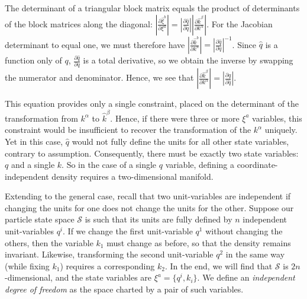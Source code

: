 \documentclass[letterpaper]{article}
\begin{document}
\noindent
The determinant of a triangular block matrix equals the product of determinants of the block matrices along the diagonal: $ \left|\frac{\partial \hat{\xi}^b}{\partial \xi^a} \right| =  \left|\frac{\partial \hat{q}}{\partial q}\right| \left|\frac{\partial \hat{k}^\beta}{\partial k^\alpha}\right|$. For the Jacobian determinant to equal one, we must therefore have  $\left|\frac{\partial \hat{k}^b}{\partial k^a} \right| =   \left|\frac{\partial \hat{q}}{\partial q}\right|^{-1}$. Since $\hat q$ is a function only of $q$, $\frac{\partial \hat{q}}{\partial q}$ is a total derivative, so we obtain the inverse by swapping the numerator and denominator. Hence, we see that $\left|\frac{\partial \hat{k}^\beta}{\partial k^\alpha} \right| = \left|\frac{\partial q}{\partial \hat q} \right|$. 

This equation provides only a single constraint, placed on the determinant of the transformation from $k^\alpha$ to $\hat{k}^\beta$. Hence, if there were three or more $\xi^a$ variables, this constraint would be insufficient to recover the transformation of the $k^\alpha$ uniquely. Yet in this case, $\hat q$  would not fully define the units for all other state variables, contrary to assumption. Consequently, there must be exactly two state variables: $q$ and a single $k$. So in the case of a single $q$ variable, defining a coordinate-independent density requires a two-dimensional manifold.

Extending to the general case, recall that two unit-variables are independent if changing the units for one does not change the units for the other. Suppose our particle state space $\mathcal{S}$ is such that its units are fully defined by $n$ independent unit-variables $q^i$. If we change the first unit-variable $q^1$ without changing the others, then the variable $k_1$ must change as before, so that the density remains invariant. Likewise, transforming the second unit-variable $q^2$ in the same way (while fixing $k_1$) requires a corresponding $k_2$. In the end, we will find that $\mathcal{S}$ is $2n$-dimensional, and the state variables are $\xi^a = \{ q^i, k_i \}$. We define an \textit{independent degree of freedom} as the space charted by a pair of such variables.
\end{document}
